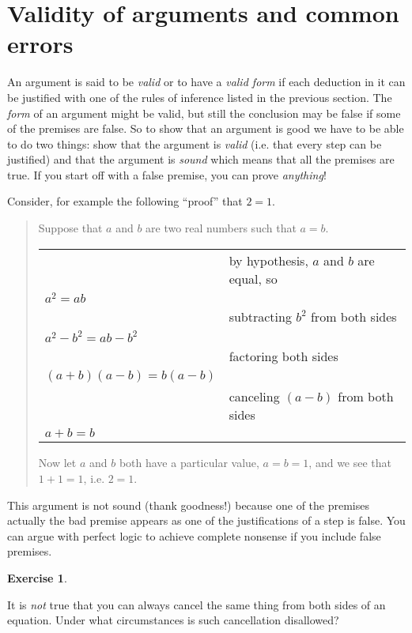 \documentclass[10pt,]{book}
\theoremstyle{plain}
\theoremstyle{definition}
\theoremstyle{definition}
\newtheorem{exercise}[theorem]{Exercise}
\numberwithin{equation}{section}
\begin{document}
\section[{Validity of arguments and common errors}]{Validity of arguments and common errors}\label{sec_valid}

    An argument is said to be \emph{valid} or to have a
    \emph{valid form}
    if each deduction in it can be justified with one of the rules
    of inference listed in the previous section. The \emph{form} of
    an argument might be valid, but still the conclusion may be false
    if some of the premises are false. So to show that an argument is
    good we have to be able to do two things: show that the argument
    is \emph{valid} (i.e. that every step can be justified) and that
    the argument is
    \emph{sound}
    which means that all the premises are
    true. If you start off with a false premise, you can prove \emph{anything}!
\par

    Consider, for example the following ``proof'' that \(2=1\).
\begin{quote}
  Suppose that \(a\) and \(b\) are two real numbers such that \(a=b\).
  \begin{tabular}{ll}
&by hypothesis, \(a\) and \(b\) are equal, so\tabularnewline[0pt]
\(a^2 = ab\)&\tabularnewline[0pt]
&subtracting \(b^2\) from both sides\tabularnewline[0pt]
\(a^2 - b^2 = ab - b^2\)&\tabularnewline[0pt]
&factoring both sides\tabularnewline[0pt]
\((a+b)(a-b) = b(a-b)\)&\tabularnewline[0pt]
&canceling \((a-b)\) from both sides\tabularnewline[0pt]
\(a+b = b\)&
\end{tabular}

  Now let \(a\) and \(b\) both have a particular value, \(a=b=1\),
  and we see that \(1+1=1\), i.e. \(2=1\).
  \end{quote}
\par

    This argument is not sound (thank goodness!) because one of the
    premises \textemdash{} actually the bad premise appears as one of the
    justifications of a step \textemdash{} is false. You can argue with
    perfect logic to achieve complete nonsense if you include
    false premises.
\begin{exercise}\label{exercise-16}

        It is \emph{not} true that you can always cancel the same thing from
        both sides of an equation. Under what circumstances is such cancellation
        disallowed?
\end{exercise}
\par
\end{document}
